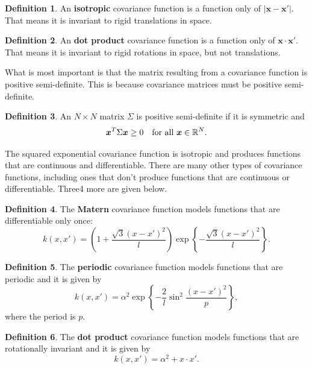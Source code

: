 \documentclass[
]{book}
\theoremstyle{definition}
\newtheorem{definition}{Definition}[chapter]
\theoremstyle{definition}
\theoremstyle{definition}
\theoremstyle{definition}
\theoremstyle{remark}
\begin{document}
\begin{definition}
An \textbf{isotropic} covariance function is a function only of \(|\boldsymbol{x} - \boldsymbol{x}'|\). That means it is invariant to rigid translations in space.
\end{definition}

\begin{definition}
An \textbf{dot product} covariance function is a function only of \(\boldsymbol{x}\cdot\boldsymbol{x}'\). That means it is invariant to rigid rotations in space, but not translations.
\end{definition}

What is most important is that the matrix resulting from a covariance function is positive semi-definite. This is because covariance matrices must be positive semi-definite.

\begin{definition}
An \(N \times N\) matrix \(\Sigma\) is positive semi-definite if it is symmetric and
\[
\boldsymbol{x}^T\Sigma\boldsymbol{x} \geq 0 \quad \hbox{for all } \boldsymbol{x} \in \mathbb{R}^N.
\]
\end{definition}

The squared exponential covariance function is isotropic and produces functions that are continuous and differentiable. There are many other types of covariance functions, including ones that don't produce functions that are continuous or differentiable. Three4 more are given below.

\begin{definition}
The \textbf{M\textquotesingle atern} covariance function models functions that are differentiable only once:
\[
k(x, x') = \left(1 + \frac{\sqrt{3}(x - x')^2}{l} \right)\exp\left\{-\frac{\sqrt{3}(x - x')^2}{l} \right\}.
\]
\end{definition}

\begin{definition}
The \textbf{periodic} covariance function models functions that are periodic and it is given by
\[
k(x, x') = \alpha^2 \exp\left\{-\frac{2}{l}\sin^2\frac{(x-x')^2}{p} \right\},
\]
where the period is \(p\).
\end{definition}

\begin{definition}
The \textbf{dot product} covariance function models functions that are rotationally invariant and it is given by
\[
k(x, x') = \alpha^2 + x\cdot x'.
\]
\end{definition}
\end{document}
